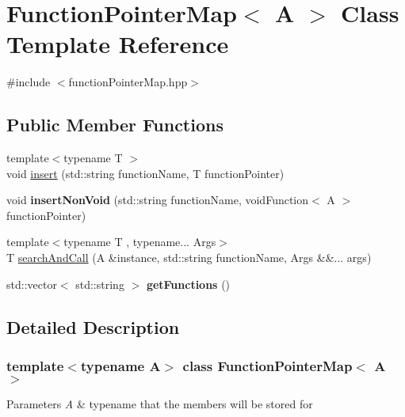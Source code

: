 \hypertarget{classFunctionPointerMap}{}\section{Function\+Pointer\+Map$<$ A $>$ Class Template Reference}
\label{classFunctionPointerMap}


{\ttfamily \#include $<$function\+Pointer\+Map.\+hpp$>$}

\subsection*{Public Member Functions}
\begin{DoxyCompactItemize}
\item 
{\footnotesize template$<$typename T $>$ }\\void \hyperlink{classFunctionPointerMap_af750cbe11e423835a4d456aebc1af7e8}{insert} (std\+::string function\+Name, T function\+Pointer)
\item 
\mbox{\label{classFunctionPointerMap_aac8051103a899531c2b5c1e38fc77d28}} 
void {\bfseries insert\+Non\+Void} (std\+::string function\+Name, void\+Function$<$ A $>$ function\+Pointer)
\item 
{\footnotesize template$<$typename T , typename... Args$>$ }\\T \hyperlink{classFunctionPointerMap_ae750181faa3848ddbdb76b58ae54f041}{search\+And\+Call} (A \&instance, std\+::string function\+Name, Args \&\&... args)
\item 
\mbox{\label{classFunctionPointerMap_a78f9bd19a9dbbb185569aafac517c974}} 
std\+::vector$<$ std\+::string $>$ {\bfseries get\+Functions} ()
\end{DoxyCompactItemize}


\subsection{Detailed Description}
\subsubsection*{template$<$typename A$>$\newline
class Function\+Pointer\+Map$<$ A $>$}


\begin{DoxyParams}{Parameters}
{\em A} & typename that the members will be stored for \\
\hline
\end{DoxyParams}


